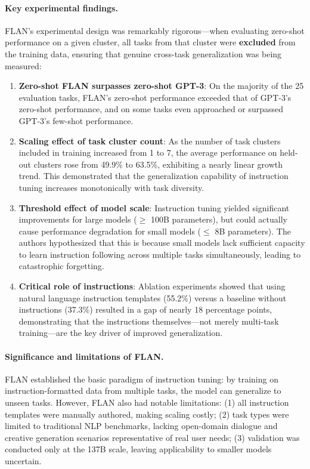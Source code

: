 \paragraph{Key experimental findings.}
FLAN's experimental design was remarkably rigorous---when evaluating zero-shot performance on a given cluster,
all tasks from that cluster were \textbf{excluded} from the training data, ensuring that genuine cross-task generalization was being measured:

\begin{enumerate}[leftmargin=1.5em]
  \item \textbf{Zero-shot FLAN surpasses zero-shot GPT-3}:
    On the majority of the 25 evaluation tasks, FLAN's zero-shot performance exceeded that of GPT-3's zero-shot performance,
    and on some tasks even approached or surpassed GPT-3's few-shot performance.

  \item \textbf{Scaling effect of task cluster count}:
    As the number of task clusters included in training increased from 1 to 7,
    the average performance on held-out clusters rose from 49.9\% to 63.5\%,
    exhibiting a nearly linear growth trend.
    This demonstrated that the generalization capability of instruction tuning increases monotonically with task diversity.

  \item \textbf{Threshold effect of model scale}:
    Instruction tuning yielded significant improvements for large models ($\geq$ 100B parameters),
    but could actually cause performance degradation for small models ($\leq$ 8B parameters).
    The authors hypothesized that this is because small models lack sufficient capacity to learn instruction following across multiple tasks simultaneously,
    leading to catastrophic forgetting.

  \item \textbf{Critical role of instructions}:
    Ablation experiments showed that using natural language instruction templates (55.2\%)
    versus a baseline without instructions (37.3\%) resulted in a gap of nearly 18 percentage points,
    demonstrating that the instructions themselves---not merely multi-task training---are the key driver of improved generalization.
\end{enumerate}

\paragraph{Significance and limitations of FLAN.}
FLAN established the basic paradigm of instruction tuning:
by training on instruction-formatted data from multiple tasks, the model can generalize to unseen tasks.
However, FLAN also had notable limitations:
(1) all instruction templates were manually authored, making scaling costly;
(2) task types were limited to traditional NLP benchmarks, lacking open-domain dialogue and creative generation scenarios representative of real user needs;
(3) validation was conducted only at the 137B scale, leaving applicability to smaller models uncertain.


